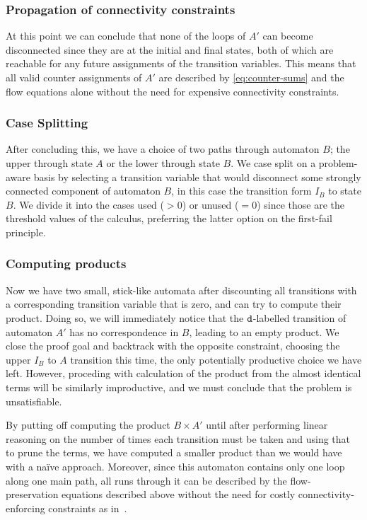 \subsubsection{Propagation of connectivity constraints}
At this point we can conclude that none of the loops of $A'$ can become
disconnected since they are at the initial and final states, both of which are
reachable for any future assignments of the transition variables. This means
that all valid counter assignments of $A'$ are described by
\cref{eq:counter-sums} and the flow equations alone without the need for
expensive connectivity constraints.

\subsubsection{Case Splitting}
After concluding this, we have a choice of two paths through automaton $B$; the
upper through state $A$ or the lower through state $B$. We case split on a
problem-aware basis by selecting a transition variable that would disconnect
some strongly connected component of automaton $B$, in this case the transition
form $I_B$ to state $B$. We divide it into the cases used ($> 0$) or unused ($ =
0$) since those are the threshold values of the calculus, preferring the latter
option on the first-fail principle.

\subsubsection{Computing products}
Now we have two small, stick-like automata after discounting all
transitions with a corresponding transition variable that is zero, and can try
to compute their product. Doing so, we will immediately notice that the
$\texttt{d}$-labelled transition of automaton $A'$ has no correspondence in $B$,
leading to an empty product. We close the proof goal and backtrack with the
opposite constraint, choosing the upper $I_B$ to $A$ transition this time, the
only potentially productive choice we have left. However, proceding with
calculation of the product from the almost identical terms will be similarly
improductive, and we must conclude that the problem is unsatisfiable.

By putting off computing the product $B \times A'$ until after performing linear
reasoning on the number of times each transition must be taken and using that to
prune the terms, we have computed a smaller product than we would have with a
na\"ive approach. Moreover, since this automaton contains only one loop along
one main path, all runs through it can be described by the flow-preservation
equations described above without the need for costly connectivity-enforcing
constraints as in~\cite{generate-parikh-image}.